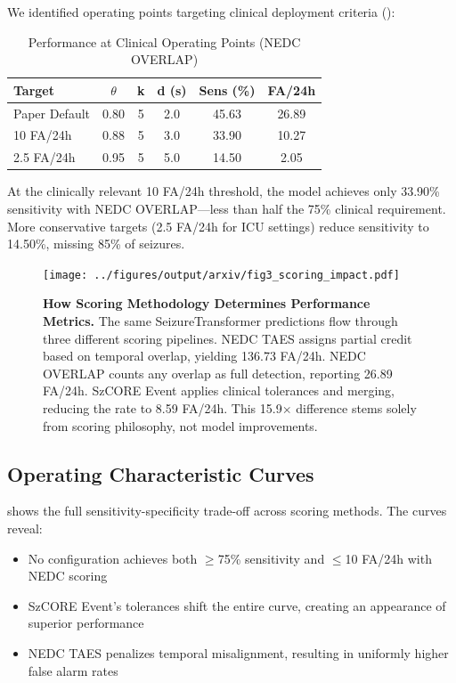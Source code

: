 \documentclass[10pt,a4paper]{article}
\begin{document}
We identified operating points targeting clinical deployment criteria ():

\begin{table}[h]
\centering
\caption{Performance at Clinical Operating Points (NEDC OVERLAP)}
\label{tab:clinical_points}
\begin{tabular}{lccccc}
\toprule
\textbf{Target} & \textbf{$\theta$} & \textbf{k} & \textbf{d (s)} & \textbf{Sens (\%)} & \textbf{FA/24h} \\
\midrule
Paper Default & 0.80 & 5 & 2.0 & 45.63 & 26.89 \\
10 FA/24h & 0.88 & 5 & 3.0 & 33.90 & 10.27 \\
2.5 FA/24h & 0.95 & 5 & 5.0 & 14.50 & 2.05 \\
\bottomrule
\end{tabular}
\end{table}

At the clinically relevant 10 FA/24h threshold, the model achieves only 33.90\% sensitivity with NEDC OVERLAP---less than half the 75\% clinical requirement. More conservative targets (2.5 FA/24h for ICU settings) reduce sensitivity to 14.50\%, missing 85\% of seizures.

\begin{figure}[t]
    \centering
    \texttt{[image: ../figures/output/arxiv/fig3\_scoring\_impact.pdf]}
    \caption{\textbf{How Scoring Methodology Determines Performance Metrics.} The same SeizureTransformer predictions flow through three different scoring pipelines. NEDC TAES assigns partial credit based on temporal overlap, yielding 136.73 FA/24h. NEDC OVERLAP counts any overlap as full detection, reporting 26.89 FA/24h. SzCORE Event applies clinical tolerances and merging, reducing the rate to 8.59 FA/24h. This 15.9$\times$ difference stems solely from scoring philosophy, not model improvements.}
    \label{fig:scoring_impact}
\end{figure}

\subsection{Operating Characteristic Curves}

 shows the full sensitivity-specificity trade-off across scoring methods. The curves reveal:

\begin{itemize}
    \item No configuration achieves both $\geq$75\% sensitivity and $\leq$10 FA/24h with NEDC scoring
    \item SzCORE Event's tolerances shift the entire curve, creating an appearance of superior performance
    \item NEDC TAES penalizes temporal misalignment, resulting in uniformly higher false alarm rates
\end{itemize}
\end{document}
